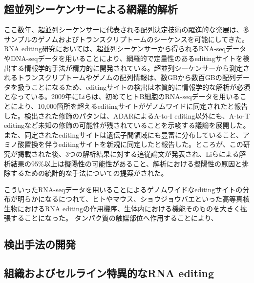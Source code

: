 \subsection{超並列シーケンサーによる網羅的解析}
ここ数年、超並列シーケンサーに代表される配列決定技術の躍進的な発展は、多サンプルのゲノムおよびトランスクリプトームのシーケンスを可能にしてきた。RNA editing研究においては、超並列シーケンサーから得られるRNA-seqデータやDNA-seqデータを用いることにより、網羅的で定量性のあるeditingサイトを検出する情報学的手法が精力的に開発されている。超並列シーケンサーから測定されるトランスクリプトームやゲノムの配列情報は、数GBから数百GBの配列データを扱うことになるため、editingサイトの検出は本質的に情報学的な解析が必須となっている。2009年にLiらは、初めてヒトB細胞のRNA-seqデータを用いることにより、10,000箇所を超えるeditingサイトがゲノムワイドに同定されたと報告した。検出された修飾のパタンは、ADARによるA-to-I editing以外にも、A-to-T editingなど未知の修飾の可能性が残されていることを示唆する議論を展開した。また、同定されたeditingサイトは遺伝子間領域にも豊富に分布していること、アミノ酸置換を伴うeditingサイトを新規に同定したと報告した。ところが、この研究が掲載された後、3つの解析結果に対する追従論文が発表され、Liらによる解析結果の95\%以上は擬陽性の可能性があること、解析における擬陽性の原因と排除するための統計的な手法についての提案がされた。

こういったRNA-seqデータを用いることによるゲノムワイドなeditingサイトの分布が明らかになるにつれて、ヒトやマウス、ショウジョウバエといった高等真核生物におけるRNA editingの作用機序、生体内における機能そのものを大きく拡張することになった。
タンパク質の触媒部位へ作用することにより、

\subsection{検出手法の開発}
\subsection{組織およびセルライン特異的なRNA editing}
